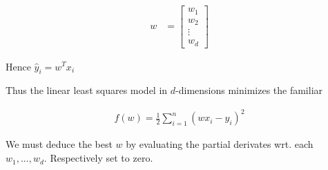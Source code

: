 \documentclass{article}
\begin{document}
\begin{align*}
w &= \begin{bmatrix}
			 w_{1} \\
			 w_{2} \\
			 \vdots \\
			 w_{d}
		 \end{bmatrix}
\end{align*}

Hence $\hat y_i = w^T x_i$

Thus the linear least squares model in $d$-dimensions minimizes the familiar

\begin{align*}
	f(w) = \frac{1}{2}\sum_{i=1}^{n}(wx_i-y_i)^2
\end{align*}

We must deduce the best $w$ by evaluating the partial derivates wrt. each $w_1, ..., w_d$. Respectively set to zero.
\end{document}
